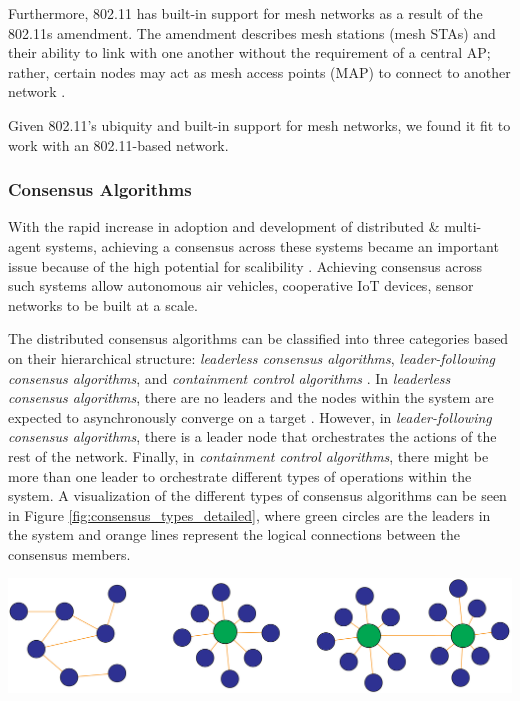 Furthermore, 802.11 has built-in support for mesh networks as a result of the 802.11s amendment. The amendment describes mesh stations (mesh STAs) and their ability to link with one another without the requirement of a central AP; rather, certain nodes may act as mesh access points (MAP) to connect to another network \cite{iov_wu2016internet, optical_zeitgeist_laboratory_2011}.

Given 802.11's ubiquity and built-in support for mesh networks, we found it fit to work with an 802.11-based network.

\subsubsection{Consensus Algorithms}
\label{conceptualization_consensus}
With the rapid increase in adoption and development of distributed \& multi-agent systems, achieving a consensus across these systems became an important issue because of the high potential for scalibility \cite{Ge_Han_Ding_Zhang_Ning_2018}. Achieving consensus across such systems allow autonomous air vehicles, cooperative IoT devices, sensor networks to be built at a scale. 

The distributed consensus algorithms can be classified into three categories based on their hierarchical structure: \emph{leaderless consensus algorithms}, \emph{leader-following consensus algorithms}, and \emph{containment control algorithms} \cite{consensus_systems_survey}. In \emph{leaderless consensus algorithms}, there are no leaders and the nodes within the system are expected to asynchronously converge on a target \cite{Ge_Han_2017}. However, in \emph{leader-following consensus algorithms}, there is a leader node that orchestrates the actions of the rest of the network. Finally, in \emph{containment control algorithms}, there might be more than one leader to orchestrate different types of operations within the system. A visualization of the different types of consensus algorithms can be seen in Figure \ref{fig:consensus_types_detailed}, where green circles are the leaders in the system and orange lines represent the logical connections between the consensus members.

\begingroup
    \centering
    \medskip
    \includegraphics[width=0.75\columnwidth]{final-proposal/images/consensus_types.png}
    \label{fig:consensus_types_detailed}
\endgroup

